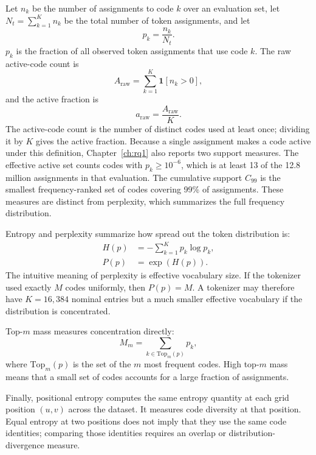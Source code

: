 Let $n_k$ be the number of assignments to code $k$ over an evaluation set, let $N_t=\sum_{k=1}^{K}n_k$ be the total number of token assignments, and let
\begin{equation}
    p_k = \frac{n_k}{N_t}.
\end{equation}
$p_k$ is the fraction of all observed token assignments that use code $k$.
The raw active-code count is
\begin{equation}
    A_{\mathrm{raw}} = \sum_{k=1}^{K}\mathbf{1}[n_k>0],
\end{equation}
and the active fraction is
\begin{equation}
    a_{\mathrm{raw}} = \frac{A_{\mathrm{raw}}}{K}.
\end{equation}
The active-code count is the number of distinct codes used at least once;
dividing it by $K$ gives the active fraction. Because a single assignment makes
a code active under this definition, Chapter~\ref{ch:rq1} also reports two
support measures. The effective active set counts codes with
$p_k\geq10^{-6}$, which is at least 13 of the 12.8 million assignments in that
evaluation. The cumulative support $C_{99}$ is the smallest frequency-ranked
set of codes covering 99\% of assignments. These measures are distinct from
perplexity, which summarizes the full frequency distribution.

Entropy and perplexity summarize how spread out the token distribution is:
\begin{align}
    H(p) &= -\sum_{k=1}^{K} p_k\log p_k, \\
    P(p) &= \exp(H(p)).
\end{align}
The intuitive meaning of perplexity is effective vocabulary size. If the tokenizer used exactly $M$ codes uniformly, then $P(p)=M$. A tokenizer may therefore have $K=16{,}384$ nominal entries but a much smaller effective vocabulary if the distribution is concentrated.

Top-$m$ mass measures concentration directly:
\begin{equation}
    M_m = \sum_{k\in \mathrm{Top}_m(p)} p_k,
\end{equation}
where $\mathrm{Top}_m(p)$ is the set of the $m$ most frequent codes. High top-$m$ mass means that a small set of codes accounts for a large fraction of assignments.

Finally, positional entropy computes the same entropy quantity at each grid
position $(u,v)$ across the dataset. It measures code diversity at that
position. Equal entropy at two positions does not imply that they use the
same code identities; comparing those identities requires an overlap or
distribution-divergence measure.

